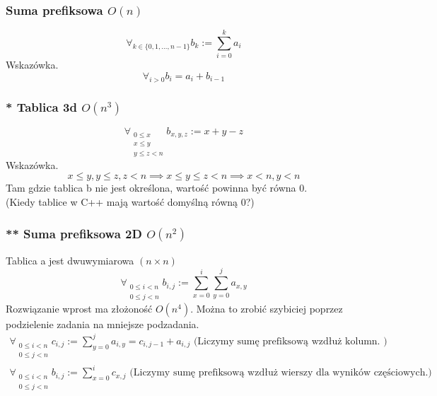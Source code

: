 \documentclass{article}
\begin{document}
\subsubsection{Suma prefiksowa $O(n)$}
\begin{displaymath}
	\forall_{k \in \{ 0, 1, \dots, n-1 \} } b_{k} := \sum_{i = 0}^{k} a_{i} 
\end{displaymath}
Wskazówka.
\begin{displaymath}
\forall_{i > 0} b_i = a_i + b_{i - 1}
\end{displaymath}

\subsubsection{* Tablica 3d $ O(n^3)$}
\begin{displaymath}
	\forall_{\substack{ 0 \leqslant x \\ x \leqslant y \\ y \leqslant z < n} }
	 b_{x, y, z} := x + y - z
\end{displaymath}
Wskazówka.
\begin{displaymath}
x \leqslant y, y \leqslant z, z < n \implies x \leqslant y \leqslant z < n \implies x < n, y < n
\end{displaymath}
Tam gdzie tablica b nie jest określona, wartość powinna być równa 0. \\
(Kiedy tablice w C++ mają wartość domyślną równą 0?)

\subsubsection{** Suma prefiksowa 2D $O(n^2)$}
Tablica a jest dwuwymiarowa $(n \times n)$
\begin{displaymath}
\forall_{\substack{ 0 \leqslant i < n \\ 0 \leqslant j < n}} b_{i, j} := \sum_{x = 0}^{i} \sum_{y = 0}^{j} a_{x, y}
\end{displaymath}
Rozwiązanie wprost ma złożoność $O(n^4)$. 
Można to zrobić szybiciej poprzez podzielenie zadania na mniejsze podzadania.
\begin{gather*}
\forall_{\substack{ 0 \leqslant i < n \\ 0 \leqslant j < n}} c_{i, j} := \sum_{y = 0}^{j} a_{i, y} = c_{i, j-1} + a_{i, j} \text{ (Liczymy sumę prefiksową wzdłuż kolumn. )} \\
\forall_{\substack{ 0 \leqslant i < n \\ 0 \leqslant j < n}} b_{i, j} := \sum_{x = 0}^{i} c_{x, j} \text{ (Liczymy sumę prefiksową wzdłuż wierszy dla wyników częściowych.) }
\end{gather*}
\end{document}
